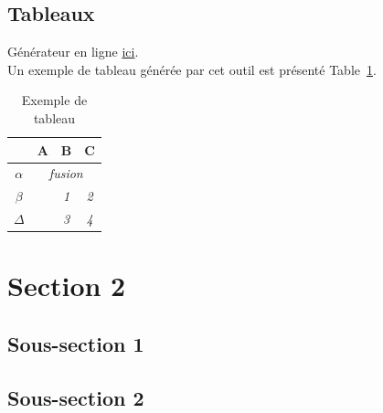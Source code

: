 \FloatBarrier
\subsection{Tableaux}

Générateur en ligne \href{http://www.tablesgenerator.com/latex_tables}{ici}. \\

Un exemple de tableau générée par cet outil est présenté Table~\ref{tableau_exemple}.

\begin{table}[]
\centering
\begin{tabular}{c|c|c|c|}
\cline{2-4}
                               & \textbf{A}                 & \textbf{B} & \textbf{C} \\ \hline
\multicolumn{1}{|c|}{$\alpha$} & \multicolumn{3}{c|}{\textit{fusion}}                 \\ \hline
\multicolumn{1}{|c|}{$\beta$}  & \multirow{2}{*}{\textit{}} & \textit{1} & \textit{2} \\ \cline{1-1} \cline{3-4} 
\multicolumn{1}{|c|}{$\Delta$} &                            & \textit{3} & \textit{4} \\ \hline
\end{tabular}
\caption{Exemple de tableau}
\label{tableau_exemple}
\end{table}


\FloatBarrier
\section{Section 2}
\subsection{Sous-section 1}
\blindtext

\subsection{Sous-section 2}
\blindtext